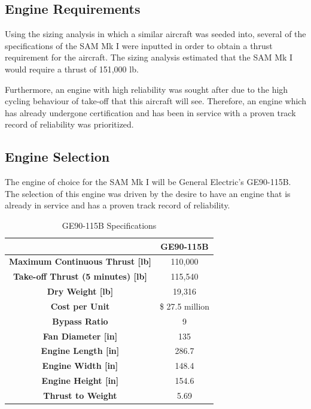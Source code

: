 \subsection{Engine Requirements}

Using the sizing analysis in which a similar aircraft was seeded into, several of the specifications of the SAM Mk I were inputted in order to obtain a thrust requirement for the aircraft. The sizing analysis estimated that the SAM Mk I would require a thrust of 151,000 lb.

Furthermore, an engine with high reliability was sought after due to the high cycling behaviour of take-off that this aircraft will see. Therefore, an engine which has already undergone certification and has been in service with a proven track record of reliability was prioritized.

\subsection{Engine Selection}

The engine of choice for the SAM Mk I will be General Electric's GE90-115B. The selection of this engine was driven by the desire to have an engine that is already in service and has a proven track record of reliability.

\begin{table}[!h]
    \centering
        \caption{GE90-115B Specifications}
    \begin{tabular}{|c||c|}\toprule
         & \textbf{GE90-115B} \\\hline \hline
         \textbf{Maximum Continuous Thrust [lb]} & 110,000  \cite{ge90} \\ \hline
         \textbf{Take-off Thrust (5 minutes) [lb]} & 115,540  \cite{ge90} \\ \hline
         \textbf{Dry Weight [lb]} & 19,316  \cite{ge90}  \\ \hline
         \textbf{Cost per Unit} &  \$ 27.5 million \cite{gecost}  \\ \hline
         \textbf{Bypass Ratio} & 9 \cite{safran}  \\ \hline
         \textbf{Fan Diameter [in]} & 135 \cite{ge} \\ \hline
         \textbf{Engine Length [in]} & 286.7 \cite{ge} \\ \hline
         \textbf{Engine Width [in]} & 148.4 \cite{ge} \\ \hline
         \textbf{Engine Height [in]} & 154.6 \cite{ge} \\ \hline
         \textbf{Thrust to Weight} & 5.69 \\ \bottomrule
    \end{tabular}
    \label{tab:GE90}
\end{table}

